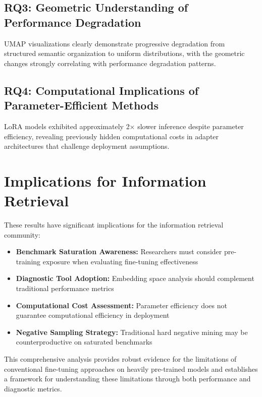 \subsection{RQ3: Geometric Understanding of Performance Degradation}

UMAP visualizations clearly demonstrate progressive degradation from structured semantic organization to uniform distributions, with the geometric changes strongly correlating with performance degradation patterns.

\subsection{RQ4: Computational Implications of Parameter-Efficient Methods}

LoRA models exhibited approximately 2× slower inference despite parameter efficiency, revealing previously hidden computational costs in adapter architectures that challenge deployment assumptions.

\section{Implications for Information Retrieval}

These results have significant implications for the information retrieval community:

\begin{itemize}
\item \textbf{Benchmark Saturation Awareness:} Researchers must consider pre-training exposure when evaluating fine-tuning effectiveness
\item \textbf{Diagnostic Tool Adoption:} Embedding space analysis should complement traditional performance metrics
\item \textbf{Computational Cost Assessment:} Parameter efficiency does not guarantee computational efficiency in deployment
\item \textbf{Negative Sampling Strategy:} Traditional hard negative mining may be counterproductive on saturated benchmarks
\end{itemize}

This comprehensive analysis provides robust evidence for the limitations of conventional fine-tuning approaches on heavily pre-trained models and establishes a framework for understanding these limitations through both performance and diagnostic metrics.
